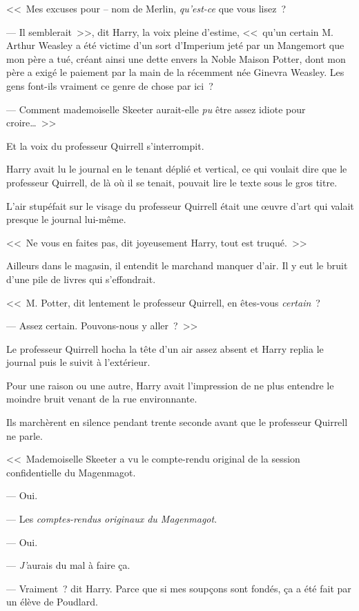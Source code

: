 <<~Mes excuses pour -- nom de Merlin, \emph{qu'est-ce} que vous lisez~?

--- Il semblerait~>>, dit Harry, la voix pleine d'estime, <<~qu'un certain M. Arthur Weasley a été victime d'un sort d'Imperium jeté par un Mangemort que mon père a tué, créant ainsi une dette envers la Noble Maison Potter, dont mon père a exigé le paiement par la main de la récemment née Ginevra Weasley. Les gens font-ils vraiment ce genre de chose par ici~?

--- Comment mademoiselle Skeeter aurait-elle \emph{pu} être assez idiote pour croire…~>>

Et la voix du professeur Quirrell s'interrompit.

Harry avait lu le journal en le tenant déplié et vertical, ce qui voulait dire que le professeur Quirrell, de là où il se tenait, pouvait lire le texte sous le gros titre.

L'air stupéfait sur le visage du professeur Quirrell était une œuvre d'art qui valait presque le journal lui-même.

<<~Ne vous en faites pas, dit joyeusement Harry, tout est truqué.~>>

Ailleurs dans le magasin, il entendit le marchand manquer d'air. Il y eut le bruit d'une pile de livres qui s'effondrait.

<<~M. Potter, dit lentement le professeur Quirrell, en êtes-vous \emph{certain}~?

--- Assez certain. Pouvons-nous y aller~?~>>

Le professeur Quirrell hocha la tête d'un air assez absent et Harry replia le journal puis le suivit à l'extérieur.

Pour une raison ou une autre, Harry avait l'impression de ne plus entendre le moindre bruit venant de la rue environnante.

Ils marchèrent en silence pendant trente seconde avant que le professeur Quirrell ne parle.

<<~Mademoiselle Skeeter a vu le compte-rendu original de la session confidentielle du Magenmagot.

--- Oui.

--- Les \emph{comptes-rendus originaux du Magenmagot}.

--- Oui.

--- \emph{J'}aurais du mal à faire ça.

--- Vraiment~? dit Harry. Parce que si mes soupçons sont fondés, ça a été fait par un élève de Poudlard.

